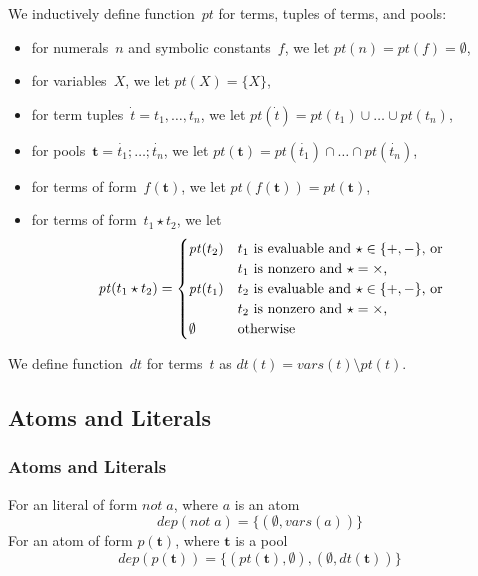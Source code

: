 \documentclass{article}
\newcommand{\pool}[1]{\boldsymbol{#1}}
\newcommand{\tuple}[1]{\dot{#1}}
\newcommand{\set}[1]{\{#1\}}
\newcommand{\dep}[2]{\{(#1), (#2)\}}
\newcommand\Vars{\mathit{vars}}
\newcommand\Provide{\mathit{pt}}
\newcommand\Depend{\mathit{dt}}
\begin{document}
	We inductively define function~$\Provide$ for terms, tuples of terms, and pools:
	\begin{itemize}
		\item
			for numerals~$n$ and symbolic constants~$f$, we let
			$\Provide(n) = \Provide(f) = \emptyset$,
		\item
			for variables~$X$, we let
			$\Provide(X) = \set{X}$,
		\item
			for term tuples~$\tuple{t} = t_1,\dots,t_n$, we let
			$\Provide(\tuple{t}) = \Provide(t_1) \cup \dots \cup \Provide(t_n)$,
		\item
			for pools~$\pool{t} = \tuple{t_1};\dots;\tuple{t_n}$, we let
			$\Provide(\pool{t}) = \Provide(\tuple{t_1}) \cap \dots \cap \Provide(\tuple{t_n})$,
		\item
			for terms of form~$f(\pool{t})$, we let
			$\Provide(f(\pool{t})) = \Provide(\pool{t})$,
		\item
			for terms of form~$t_1 \star t_2$, we let
				\begin{align*}
				\Provide(t_1 \star t_2) = \begin{cases}
					\Provide(t_2) & \text{\shortstack[l]{$t_1$ is evaluable and ${\star} \in \set{{+}, {-}}$}, or}\\
					              & \text{\shortstack[l]{$t_1$ is nonzero and ${\star} = {\times}$,}}\\
					\Provide(t_1) & \text{\shortstack[l]{$t_2$ is evaluable and ${\star} \in \set{{+}, {-}}$}, or}\\
					              & \text{\shortstack[l]{$t_2$ is nonzero and ${\star} = {\times}$,}}\\
					\emptyset & \text{otherwise}
				\end{cases}
				\end{align*}
	\end{itemize}
	We define function~$\Depend$ for terms~$t$ as $\Depend(t) = \Vars(t) \setminus \Provide(t)$.

	\subsection{Atoms and Literals}
	\subsubsection{Atoms and Literals}
	For an literal of form $not \; a$, where $a$ is an atom
	\begin{equation*}
		dep(not \; a) = \set{(\emptyset, vars(a))}
	\end{equation*}
	For an atom of form $p(\pool{t})$, where $\pool{t}$ is a pool
	\begin{equation*}
		dep(p(\pool{t})) = \dep{\Provide(\pool{t}), \emptyset}{\emptyset, \Depend(\pool{t})}
	\end{equation*}
\end{document}
